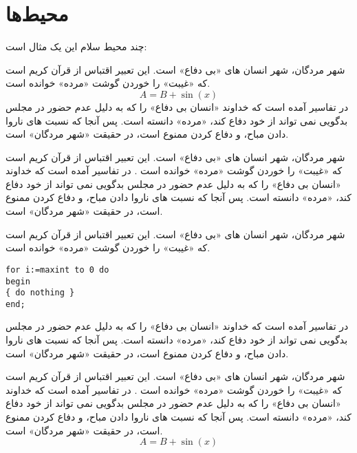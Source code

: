 \documentclass{report}
\begin{document}
\chapter{محیط‌ها}
چند محیط
سلام این یک مثال است:

\begin{note}
شهر مردگان، شهر انسان های «بی دفاع» است. این تعبیر اقتباس از قرآن کریم است که «غیبت» را خوردن گوشت «مرده» خوانده است. 
\begin{equation}
A = B + \sin (x)
\end{equation}
در تفاسیر آمده است که خداوند «انسان بی دفاع» را که به دلیل عدم حضور در مجلس بدگویی نمی تواند از خود دفاع کند، «مرده» دانسته است. پس آنجا که نسبت های ناروا دادن مباح، و دفاع کردن ممنوع است، در حقیقت «شهر مردگان» است.
\end{note}

\begin{problem}
شهر مردگان، شهر انسان های «بی دفاع» است. این تعبیر اقتباس از قرآن کریم است که «غیبت» را خوردن گوشت «مرده» خوانده است . در تفاسیر آمده است که خداوند «انسان بی دفاع» را که به دلیل عدم حضور در مجلس بدگویی نمی تواند از خود دفاع کند، «مرده» دانسته است. پس آنجا که نسبت های ناروا دادن مباح، و دفاع کردن ممنوع است، در حقیقت «شهر مردگان» است.


\end{problem}


\begin{refer}
شهر مردگان، شهر انسان های «بی دفاع» است. این تعبیر اقتباس از قرآن کریم است که «غیبت» را خوردن گوشت «مرده» خوانده است.
\begin{latin}
\lstset{numbers=none,frame=none}
\begin{lstlisting}
for i:=maxint to 0 do
begin
{ do nothing }
end;
\end{lstlisting}
\end{latin}
  در تفاسیر آمده است که خداوند «انسان بی دفاع» را که به دلیل عدم حضور در مجلس بدگویی نمی تواند از خود دفاع کند، «مرده» دانسته است. پس آنجا که نسبت های ناروا دادن مباح، و دفاع کردن ممنوع است، در حقیقت «شهر مردگان» است.
\end{refer}

\begin{info}
شهر مردگان، شهر انسان های «بی دفاع» است. این تعبیر اقتباس از قرآن کریم است که «غیبت» را خوردن گوشت «مرده» خوانده است . 
در تفاسیر آمده است که خداوند «انسان بی دفاع» را که به دلیل عدم حضور در مجلس بدگویی نمی تواند از خود دفاع کند، «مرده» دانسته است. پس آنجا که نسبت های ناروا دادن مباح، و دفاع کردن ممنوع است، در حقیقت «شهر مردگان» است.
\begin{equation}
A = B + \sin (x)
\end{equation}
\end{info}
\end{document}
